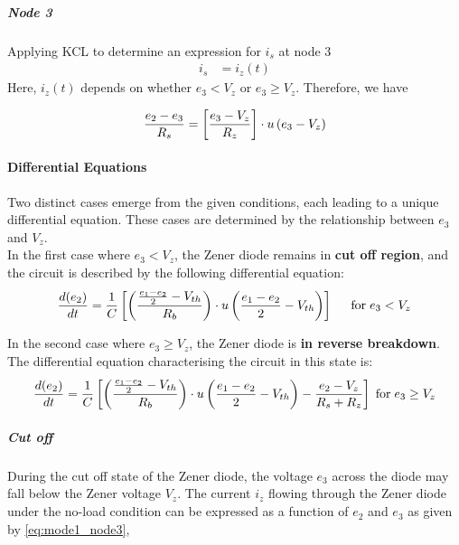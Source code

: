 \subparagraph{Node \textcircled{3}}
Applying KCL to determine an expression for $i_s$ at node \textcircled{3}
\begin{equation}
    \begin{split}
        i_s &= i_z(t)
    \end{split}
\end{equation}
Here, \(i_z(t)\) depends on whether \(e_3 < V_z\) or \(e_3 \geq V_z\). Therefore, we have

\begin{equation}
    \frac{e_2 - e_3}{R_s} = \left[\frac{e_3 - V_z}{R_z} \right]\cdot u\left(e_3 - V_z \right)
    \label{eq:mode1_node3}
\end{equation}

\paragraph{Differential Equations}
Two distinct cases emerge from the given conditions, each leading to a unique differential equation. These cases are determined by the relationship between \(e_3\) and \(V_z\).\\

In the first case where \(e_3 < V_z\), the Zener diode remains in \textbf{cut off region}, and the circuit is described by the following differential equation:
\begin{equation}
    \frac{d(e_2)}{dt}=\frac{1}{C} \left[\left(\frac{\frac{e_1 - e_2}{2} - V_{th}}{R_b} \right) \cdot u\left(\frac{e_1-e_2}{2}-V_{th} \right) \right] \hspace{0.5cm} \text{for} \hspace{0.1cm} e_3 < V_z
\end{equation}

In the second case where \(e_3 \geq V_z\), the Zener diode is \textbf{in reverse breakdown}. The differential equation characterising the circuit in this state is:
\begin{equation}
   \frac{d(e_2)}{dt}=\frac{1}{C}\left[\left(\frac{\frac{e_1 - e_2}{2} - V_{th}}{R_b} \right)\cdot u\left(\frac{e_1 - e_2}{2} - V_{th} \right)-\frac{e_2-V_z}{R_s+R_z} \right] \hspace{0.1cm} \text{for} \hspace{0.1cm} e_3 \geq V_z
\end{equation}

\subparagraph{Cut off}
During the cut off state of the Zener diode, the voltage $e_3$ across the diode may fall below the Zener voltage $V_z$. The current $i_z$ flowing through the Zener diode under the no-load condition can be expressed as a function of $e_2$ and $e_3$ as given by \eqref{eq:mode1_node3},

